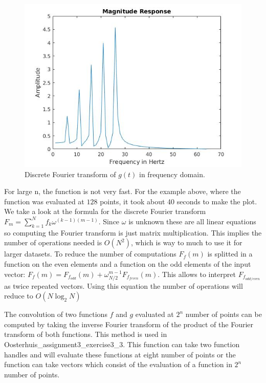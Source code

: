 \documentclass[12pt]{article}
\begin{document}
%
\begin{figure}[H]
\centering
\includegraphics[width=0.6\linewidth,natwidth=610,natheight=642]{ex3_func_wiki_1_four.jpg}
\caption{Discrete Fourier transform of $g(t)$ in frequency domain.}
\label{fig3_1}
\end{figure}

For large n, the function is not very fast. For the example above, where the function was evaluated at $128$ points, it took about 40 seconds to make the plot. We take a look at the formula for the discrete Fourier transform $F_m = \sum_{k=1}^{N}f_k\omega^{(k-1)(m-1)}$. Since $\omega$ is unknown these are all linear equations so computing the Fourier transform is just matrix multiplication. This implies the number of operations needed is $O(N^2)$, which is way to much to use it for larger datasets. To reduce the number of computations $F_f(m)$ is splitted in a function on the even elements and a function on the odd elements of the input vector: $F_f(m) = F_{f_{odd}}(m) + \omega_{N/2}^{m-1}F_{f_{feven}}(m).$ This allows to interpret $F_{f_{odd/even}}$ as twice repeated vectors. Using this equation the number of operations will reduce to $O(N \log_2 N)$

The convolution of two functions $f$ and $g$ evaluated at $2^n$ number of points can be computed by taking the inverse Fourier transform of the product of the Fourier transform of both functions. This method is used in Oosterhuis\_assignment3\_exercise3\_3. This function can take two function handles and will evaluate these functions at eight number of points or the function can take vectors which consist of the evaluation of a function in $2^n$ number of points.
\end{document}
